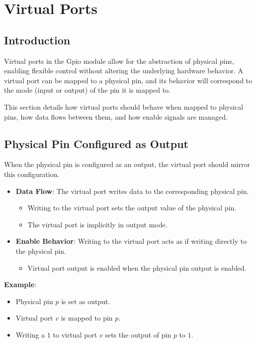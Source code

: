 \section{Virtual Ports}

\subsection{Introduction}
Virtual ports in the Gpio module allow for the abstraction of physical pins, enabling flexible control without altering the underlying hardware behavior. A virtual port can be mapped to a physical pin, and its behavior will correspond to the mode (input or output) of the pin it is mapped to.

This section details how virtual ports should behave when mapped to physical pins, how data flows between them, and how enable signals are managed.

\subsection{Physical Pin Configured as Output}
When the physical pin is configured as an output, the virtual port should mirror this configuration.

\begin{itemize}[noitemsep]
    \item \textbf{Data Flow}: The virtual port writes data to the corresponding physical pin.
    \begin{itemize}[noitemsep]
        \item Writing to the virtual port sets the output value of the physical pin.
        \item The virtual port is implicitly in output mode.
    \end{itemize}
    \item \textbf{Enable Behavior}: Writing to the virtual port acts as if writing directly to the physical pin.
    \begin{itemize}[noitemsep]
        \item Virtual port output is enabled when the physical pin output is enabled.
    \end{itemize}
\end{itemize}

\textbf{Example}:
\begin{itemize}[noitemsep]
    \item Physical pin $p$ is set as output.
    \item Virtual port $v$ is mapped to pin $p$.
    \item Writing a $1$ to virtual port $v$ sets the output of pin $p$ to $1$.
\end{itemize}

